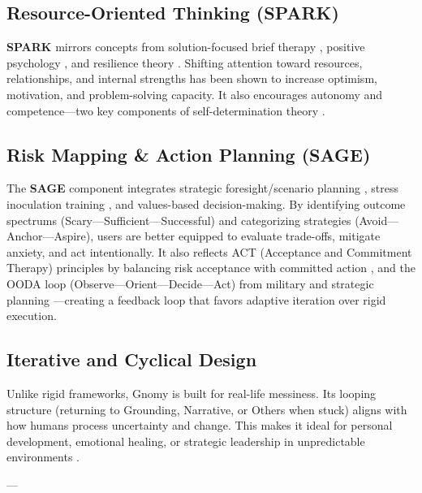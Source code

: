 \documentclass{article}
\begin{document}
\subsection{Resource-Oriented Thinking (SPARK)}
\textbf{SPARK} mirrors concepts from solution-focused brief therapy \cite{de1997building}, positive psychology \cite{seligman2011flourish}, and resilience theory \cite{masten2001ordinary}. Shifting attention toward resources, relationships, and internal strengths has been shown to increase optimism, motivation, and problem-solving capacity. It also encourages autonomy and competence—two key components of self-determination theory \cite{ryan2000self}.

\subsection{Risk Mapping \& Action Planning (SAGE)}
The \textbf{SAGE} component integrates strategic foresight/scenario planning \cite{schoemaker1995scenario}, stress inoculation training \cite{meichenbaum1985stress}, and values-based decision-making. By identifying outcome spectrums (Scary—Sufficient—Successful) and categorizing strategies (Avoid—Anchor—Aspire), users are better equipped to evaluate trade-offs, mitigate anxiety, and act intentionally. It also reflects ACT (Acceptance and Commitment Therapy) principles by balancing risk acceptance with committed action \cite{hayes1999acceptance}, and the OODA loop (Observe—Orient—Decide—Act) from military and strategic planning \cite{boyd1986destruction}—creating a feedback loop that favors adaptive iteration over rigid execution.

\subsection{Iterative and Cyclical Design}
Unlike rigid frameworks, Gnomy is built for real-life messiness. Its looping structure (returning to Grounding, Narrative, or Others when stuck) aligns with how humans process uncertainty and change. This makes it ideal for personal development, emotional healing, or strategic leadership in unpredictable environments \cite{kolb1984experiential}.

---
\end{document}
